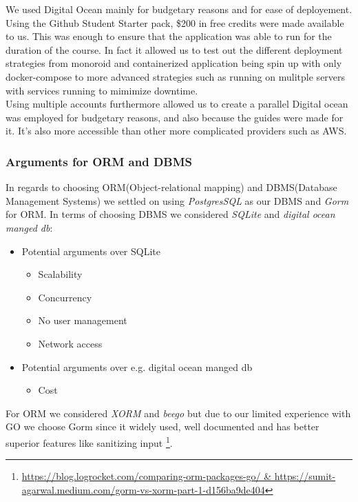 We used Digital Ocean mainly for budgetary reasons and for ease of deployement. Using the Github Student 
Starter pack, \$200 in free credits were made available to us. This was enough to ensure that the application 
was able to run for the duration of the course. In fact it allowed us to test out the different deployment strategies
from monoroid and containerized application being spin up with only docker-compose to more advanced strategies such as
running on mulitple servers with services running to mimimize downtime.\\

Using multiple accounts furthermore allowed us to create a parallel Digital ocean was employed for budgetary reasons, and also because the guides were made for it.
It's also more accessible than other more complicated providers such as AWS. 

\subsubsection{Arguments for ORM and DBMS}
In regards to choosing ORM(Object-relational mapping) and DBMS(Database Management Systems) we settled on 
using \textit{PostgresSQL} as our DBMS and \textit{Gorm} for ORM. In terms of choosing DBMS we considered 
\textit{SQLite} and \textit{digital ocean manged db}:
\begin{itemize}
    \item Potential arguments over SQLite 
    \begin{itemize}
        \item Scalability
        \item Concurrency
        \item No user management
        \item Network access        
    \end{itemize}
    \item Potential arguments over e.g. digital ocean manged db
    \begin{itemize}
        \item Cost
    \end{itemize}
\end{itemize}

For ORM we considered \textit{XORM} and \textit{beego} but due to our limited experience with GO we choose Gorm 
since it widely used, well documented and has better superior features like sanitizing input \footnote{\url{https://blog.logrocket.com/comparing-orm-packages-go/ & https://sumit-agarwal.medium.com/gorm-vs-xorm-part-1-d156ba9de404}}.


